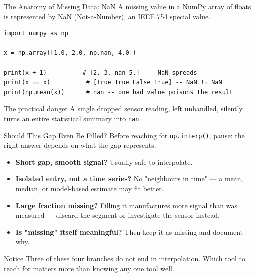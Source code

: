 \documentclass[9pt,aspectratio=169,xcolor=table]{beamer}
\begin{document}
\begin{frame}[fragile]{The Anatomy of Missing Data: NaN}
    \leavevmode
    A missing value in a NumPy array of floats is represented by
    \alert{NaN} (Not-a-Number), an IEEE 754 special value.

\begin{lstlisting}
import numpy as np

x = np.array([1.0, 2.0, np.nan, 4.0])

print(x + 1)          # [2. 3. nan 5.]  -- NaN spreads
print(x == x)          # [True True False True] -- NaN != NaN
print(np.mean(x))      # nan -- one bad value poisons the result
\end{lstlisting}

    \vspace{1mm}
    \begin{alertblock}{The practical danger}
        A single dropped sensor reading, left unhandled, silently
        turns an entire statistical summary into \texttt{nan}.
    \end{alertblock}
\end{frame}

\begin{frame}{Should This Gap Even Be Filled?}
    \leavevmode
    \small
    Before reaching for \texttt{np.interp()}, pause: the right answer
    depends on what the gap \alert{represents}.

    \vspace{2mm}
    \begin{itemize}
        \item \textbf{Short gap, smooth signal?} Usually safe to
              \alert{interpolate}.
        \item \textbf{Isolated entry, not a time series?} No
              "neighbours in time" --- a \alert{mean, median, or
              model-based estimate} may fit better.
        \item \textbf{Large fraction missing?} Filling it manufactures
              more signal than was measured --- \alert{discard the
              segment} or investigate the sensor instead.
        \item \textbf{Is "missing" itself meaningful?} Then
              \alert{keep it as missing and document why}.
    \end{itemize}

    \vspace{2mm}
    \begin{block}{Notice}
        Three of these four branches do \alert{not} end in
        interpolation. Which tool to reach for matters more than
        knowing any one tool well.
    \end{block}
\end{frame}
\end{document}
